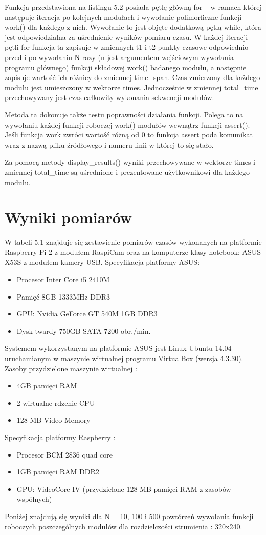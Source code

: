 Funkcja przedstawiona na listingu 5.2 posiada pętlę główną for – w ramach której następuje iteracja po kolejnych modułach i wywołanie polimorficzne funkcji work() dla każdego z nich. Wywołanie to jest objęte dodatkową pętlą while, która jest odpowiedzialna za uśrednienie wyników pomiaru czasu. W każdej iteracji pętli for funkcja ta zapisuje w zmiennych t1 i t2 punkty czasowe odpowiednio przed i po wywołaniu N-razy (n jest argumentem wejściowym wywołania programu głównego) funkcji składowej work() badanego modułu, a następnie zapisuje wartość ich różnicy do zmiennej time\_span. Czas zmierzony dla każdego modułu jest umieszczony w wektorze times. Jednocześnie w zmiennej total\_time przechowywany jest czas całkowity wykonania sekwencji modułów.

Metoda ta dokonuje także testu poprawności działania funkcji. Polega to na wywołaniu każdej funkcji roboczej work() modułów wewnątrz funkcji assert().
Jeśli funkcja work zwróci wartość różną od 0 to funkcja assert poda komunikat wraz z nazwą pliku źródłowego i numeru linii w której to się stało.

Za pomocą metody display\_results() wyniki  przechowywane w wektorze times i zmiennej total\_time są uśrednione i prezentowane użytkownikowi dla każdego modułu.

\section{ Wyniki pomiarów}
W tabeli 5.1 znajduje się zestawienie pomiarów czasów wykonanych na platformie Raspberry Pi 2 z modułem RaspiCam oraz na komputerze klasy notebook: ASUS  X53S z modułem kamery USB.
Specyfikacja platformy ASUS:
\begin{itemize}[noitemsep]
\item Procesor Inter Core i5 2410M
\item Pamięć 8GB 1333MHz DDR3
\item GPU: Nvidia GeForce GT 540M 1GB DDR3
\item Dysk twardy 750GB SATA 7200 obr./min.
\end{itemize}
Systemem wykorzystanym na platformie ASUS jest Linux Ubuntu 14.04 uruchamianym w maszynie wirtualnej programu VirtualBox (wersja 4.3.30). 
Zasoby przydzielone maszynie wirtualnej :
\begin{itemize}[noitemsep]
\item 4GB pamięci RAM
\item 2 wirtualne rdzenie CPU
\item 128 MB Video Memory
\end{itemize}
Specyfikacja platformy Raspberry :
\begin{itemize}[noitemsep]
\item Procesor BCM 2836  quad core
\item 1GB pamięci RAM DDR2
\item GPU: VideoCore IV (przydzielone 128 MB pamięci RAM z zasobów wspólnych)
\end{itemize}
Poniżej znajdują się wyniki dla N = 10, 100 i 500 powtórzeń wywołania funkcji roboczych poszczególnych modułów dla rozdzielczości strumienia : 320x240.


